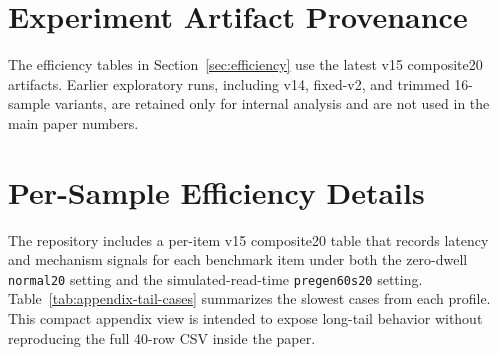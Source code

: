 ﻿\documentclass[11pt]{article}
\begin{document}


\appendix
\section{Experiment Artifact Provenance}
\label{app:provenance}
The efficiency tables in Section~\ref{sec:efficiency} use the latest v15 composite20 artifacts. Earlier exploratory runs, including v14, fixed-v2, and trimmed 16-sample variants, are retained only for internal analysis and are not used in the main paper numbers.

\begin{table}[t]
\centering
\small
{}
\caption{Source-of-truth artifacts for the efficiency evaluation. Paths are repository-relative.}
\label{tab:artifact-provenance}
\end{table}

\section{Per-Sample Efficiency Details}
\label{app:per-sample-efficiency}
The repository includes a per-item v15 composite20 table that records latency and mechanism signals for each benchmark item under both the zero-dwell \texttt{normal20} setting and the simulated-read-time \texttt{pregen60s20} setting. Table~\ref{tab:appendix-tail-cases} summarizes the slowest cases from each profile. This compact appendix view is intended to expose long-tail behavior without reproducing the full 40-row CSV inside the paper.
\end{document}
